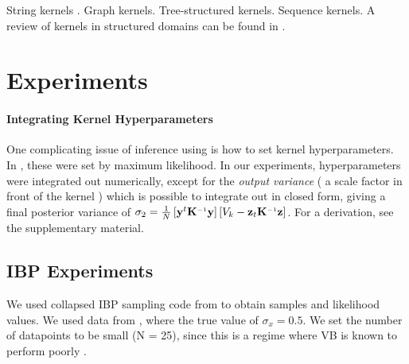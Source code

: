 String kernels \cite{lodhi2002text}.   Graph kernels.  Tree-structured kernels.  Sequence kernels.  A review of kernels in structured domains can be found in \cite{gartner2003survey}.

\section{Experiments}

\paragraph{Integrating Kernel Hyperparameters}

%
%
One complicating issue of inference using \bq{} is how to set kernel hyperparameters.  In \cite{BZMonteCarlo}, these were set by maximum likelihood.  In our experiments, hyperparameters were integrated out numerically, except for the \emph{output variance} ( a scale factor in front of the kernel ) which is possible to integrate out in closed form, giving a final posterior variance of
$\sigma_2 = \frac{1}{N} \left[\vy^t \vK\inv \vy \right] \left[ V_k - \vz_t \vK\inv \vz \right]$.  For a derivation, see the supplementary material.


\subsection{IBP Experiments}
We used collapsed IBP sampling code from \cite{doshi2009accelerated} to obtain samples and likelihood values.   We used data from \cite{wood2007particle}, where the true value of $\sigma_x = 0.5$. We set the number of datapoints to be small (N = 25), since this is a regime where VB is known to perform poorly \cite{miller2009variational}.  %

